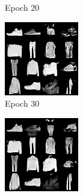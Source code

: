 \documentclass{article}
\begin{document}
\begin{figure}[h!]
\begin{subfigure}{0.19\textwidth}
        \caption{Epoch 20}
    \end{subfigure}
    \begin{subfigure}{0.19\textwidth}
        \includegraphics[width=\linewidth]{images/image_at_epoch_030.png}
        \caption{Epoch 30}
    \end{subfigure}
    \begin{subfigure}{0.19\textwidth}
        \includegraphics[width=\linewidth]{images/image_at_epoch_040.png}

\end{subfigure}
\end{figure}
\end{document}
